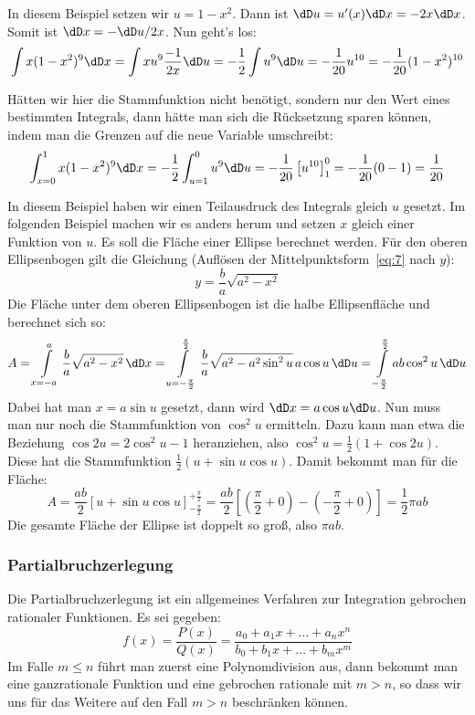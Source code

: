 In diesem Beispiel setzen wir $u=1-x^2$. Dann ist $\dD u=u'(x)\dD x=-2x\dD x$.
Somit ist $\dD x=-\dD u/2x$. Nun geht's los:
\[
\int x(1-x^2)^9\dD x=\int x u^9 \frac{-1}{2x}\dD u
=-\frac{1}{2}\int u^9\dD u=-\frac{1}{20}u^{10}=-\frac{1}{20}(1-x^2)^{10}
\]

Hätten wir hier die Stammfunktion nicht benötigt, sondern nur den Wert eines
bestimmten Integrals, dann hätte man sich die Rücksetzung sparen können, indem
man die Grenzen auf die neue Variable umschreibt:
\[
\int_{x=0}^1 x(1-x^2)^9\dD x=-\frac{1}{2}\int_{u=1}^0u^9\dD u
=-\frac{1}{20}\left[u^{10}\right]_1^0=-\frac{1}{20}(0-1)=\frac{1}{20}
\]

In diesem Beispiel haben wir einen Teilausdruck des Integrals gleich $u$
gesetzt. Im folgenden Beispiel machen wir es anders herum und setzen $x$
gleich einer Funktion von $u$. Es soll die Fläche einer Ellipse berechnet
werden. Für den oberen Ellipsenbogen gilt die Gleichung (Auflösen der
Mittelpunktsform~\eqref{eq:7} nach $y$):
\[
y=\frac{b}{a}\sqrt{a^2-x^2}
\]
Die Fläche unter dem oberen Ellipsenbogen ist die halbe Ellipsenfläche und
berechnet sich so:
\[
A=\int\limits_{x=-a}^a \frac{b}{a}\sqrt{a^2-x^2}\,\dD x=
\int\limits_{u=-\frac{\pi}{2}}^{\frac{\pi}{2}}
\frac{b}{a}\sqrt{a^2-a^2\sin^2u}\,a\cos u\,\dD u=
\int\limits_{-\frac{\pi}{2}}^{\frac{\pi}{2}}ab\cos^2u\,\dD u
\]
Dabei hat man $x=a\sin u$ gesetzt, dann wird $\dD x=a\cos u \dD u$. Nun muss
man nur noch die Stammfunktion von $\cos^2u$ ermitteln. Dazu kann man etwa die
Beziehung $\cos2u=2\cos^2u-1$ heranziehen, also
$\cos^2u=\frac{1}{2}(1+\cos2u)$. Diese hat die Stammfunktion
$\frac{1}{2}(u+\sin u\cos u)$. Damit bekommt man für die Fläche:
\[
A=\frac{ab}{2}\left[u+\sin u\cos u\right]_{-\frac{\pi}{2}}^{+\frac{\pi}{2}}=
\frac{ab}{2}[(\frac{\pi}{2}+0)-(-\frac{\pi}{2}+0)]=\frac{1}{2}\pi a b
\]
Die gesamte Fläche der Ellipse ist doppelt so groß, also $\pi a b$.

\subsubsection{Partialbruchzerlegung}
Die Partialbruchzerlegung ist ein allgemeines Verfahren zur Integration
gebrochen rationaler Funktionen. Es sei gegeben:
\begin{equation}
  \label{eq:68}
  f(x)=\frac{P(x)}{Q(x)}
  =\frac{a_0+a_1x+\dots+a_nx^n}{b_0+b_1x+\dots+b_mx^m}
\end{equation}
Im Falle $m\le n$ führt man zuerst eine Polynomdivision aus, dann bekommt man
eine ganzrationale Funktion und eine gebrochen rationale mit $m>n$, so dass
wir uns für das Weitere auf den Fall $m>n$ beschränken können.

